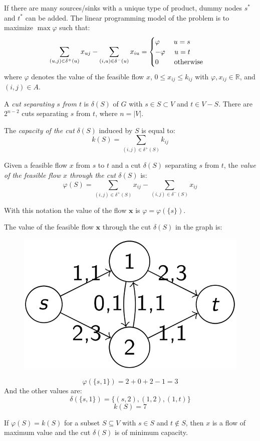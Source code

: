 \documentclass[12pt, a4paper]{report}
\begin{document}
    If there are many sources/sinks with a unique type of product, dummy nodes $s^{*}$ and $t^{*}$ can be added. The linear programming model of the problem is to maximize 
    $\max \varphi$ such that: 
    \[\sum_{(u,j)\in \delta^{+}(u)}x_{uj}-\sum_{(i,u)\in \delta^{-}(u)}x_{iu}=
    \begin{cases}
        \varphi \:\:\:\:\:\:\:\:\: u=s    \\
        -\varphi \:\:\:\:\:\: u=t   \\
        0 \:\:\:\:\:\:\:\:\:\: \textnormal{otherwise}
    \end{cases}\]
    where $\varphi$ denotes the value of the feasible flow $x$, $0 \leq x_{ij} \leq k_{ij}$ with $\varphi,x_{ij} \in \mathbb{R}$, and $(i,j) \in A$.
    \begin{definition}
        A \emph{cut separating $s$ from $t$} is $\delta(S)$ of $G$ with $s \in S \subset V$ and $t \in V-S$. There are $2^{n-2}$ cuts separating $s$ from $t$, where 
        $n=\left\lvert V \right\rvert $.

        The \emph{capacity of the cut} $\delta(S)$ induced by $S$ is equal to: 
        \[k(S)=\sum_{(i,j)\in \delta^{+}(S)}k_{ij}\]

        Given a feasible flow $x$ from $s$ to $t$ and a cut $\delta(S)$ separating $s$ from $t$, the \emph{value of the feasible flow $x$ through the cut $\delta(S)$} is: 
        \[\varphi(S)=\sum_{(i,j)\in \delta^{+}(S)}x_{ij} - \sum_{(i,j)\in \delta^{-}(S)}x_{ij}\]
    \end{definition}
    With this notation the value of the flow $\boldsymbol{x}$ is $\varphi = \varphi(\{s\})$. 
    \begin{example}
        The value of the feasible flow $\boldsymbol{x}$ through the cut $\delta(S)$ in the graph is: 
        \begin{figure}[H]
            \centering
            \includegraphics[width=0.3\linewidth]{images/flow.png}
        \end{figure}
        \[\varphi(\{s,1\})=2+0+2-1=3\]
        And the other values are: 
        \[\delta(\{s,1\})=\{(s, 2),(1,2),(1, t)\}\]
        \[k(S)=7\]
    \end{example}
    If $\varphi(S) = k(S)$ for a subset $S \subseteq V$ with $s \in S$ and $t \notin S$, then $x$ is a flow of maximum value and the cut $\delta(S)$ is of minimum capacity. 
\end{document}
